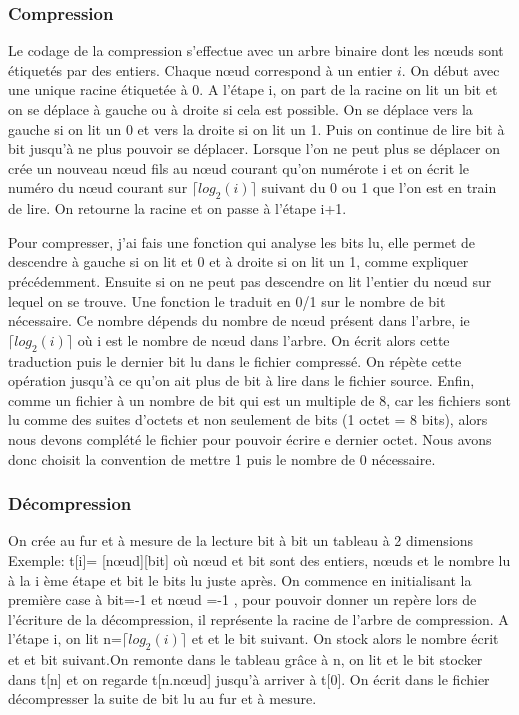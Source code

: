 \documentclass{report}
\begin{document}
\subsubsection{Compression}
Le codage de la compression s'effectue avec un arbre binaire dont les nœuds sont étiquetés par des entiers. Chaque nœud correspond à un entier $i$. On début avec une unique racine étiquetée à 0.
A l'étape i, on part de la racine on lit un bit et on se déplace à gauche ou à droite si cela est possible. On se déplace vers la gauche si on lit un 0 et vers la droite si on lit un 1. Puis on continue de lire bit à bit jusqu'à ne plus pouvoir se déplacer. Lorsque l'on ne peut plus se déplacer on crée un nouveau nœud fils au nœud courant qu'on numérote i et on écrit le numéro du nœud courant sur $\lceil log_{2}(i) \rceil$ suivant du 0 ou 1 que l'on est en train de lire.
On retourne la racine et on passe à l'étape i+1.

Pour compresser, j'ai fais une fonction qui analyse les bits lu, elle permet de descendre à gauche si on lit et 0 et à droite si on lit un 1, comme expliquer précédemment. Ensuite si on ne peut pas descendre on lit l'entier du nœud sur lequel on se trouve. Une fonction le traduit en 0/1 sur le nombre de bit nécessaire. Ce nombre dépends du nombre de nœud présent dans l'arbre, ie $\lceil log_{2}(i) \rceil$ où i est le nombre de nœud dans l'arbre. 
On écrit alors cette traduction puis le dernier bit lu dans le fichier compressé. On répète cette opération jusqu'à ce qu'on ait plus de bit  à lire dans le fichier source.
Enfin, comme un fichier à un nombre de bit qui est un multiple de 8, car les fichiers sont lu comme des suites d'octets et non seulement de bits (1 octet = 8 bits),  alors nous devons complété le fichier pour pouvoir écrire e dernier octet.
Nous avons donc choisit la convention de mettre 1 puis le nombre de 0 nécessaire. 

\subsubsection{Décompression}
On crée au fur et à mesure de la lecture bit à bit un tableau à 2 dimensions Exemple: t[i]= [nœud][bit] où nœud et bit sont des entiers, nœuds et le nombre lu à la i ème étape et bit le bits lu juste après. 
On commence en initialisant la première case à  bit=-1 et nœud =-1 , pour pouvoir donner un repère lors de l'écriture de la décompression, il représente la racine de l'arbre de compression.  
A l'étape i, on lit n=$\lceil log_{2}(i) \rceil$ et et le bit suivant. On stock alors le nombre écrit et et bit suivant.On remonte dans le tableau grâce à n, on lit et le bit stocker dans t[n] et on regarde t[n.nœud] jusqu'à arriver à t[0]. On écrit dans le fichier décompresser la suite de bit lu au fur et à mesure.
\end{document}
